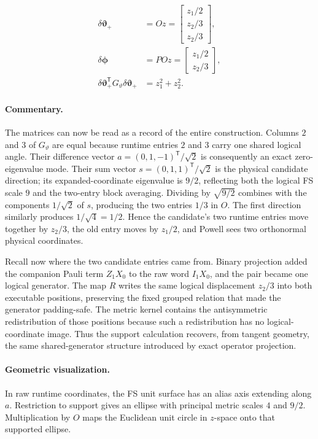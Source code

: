 \documentclass[10pt,twocolumn]{article}
\newcommand{\commentaryblock}{\paragraph{Commentary.}}
\newcommand{\geometryblock}{\paragraph{Geometric visualization.}}
\begin{document}
\begin{align}
\delta\bm\vartheta_+
&=Oz
=\begin{bmatrix}z_1/2\\z_2/3\\z_2/3\end{bmatrix},\nonumber\\
\delta\bm\phi
&=POz
=\begin{bmatrix}z_1/2\\z_2/3\end{bmatrix},\nonumber\\
\delta\bm\vartheta_+^{\mathsf T}G_\vartheta
\delta\bm\vartheta_+
&=z_1^2+z_2^2.
\label{eq:toy-final-map}
\end{align}

\commentaryblock The matrices can now be read as a record of the entire
construction. Columns \(2\) and \(3\) of \(G_\vartheta\) are equal because
runtime entries \(2\) and \(3\) carry one shared logical angle. Their
difference vector \(a=(0,1,-1)^{\mathsf T}/\sqrt2\) is consequently an exact
zero-eigenvalue mode. Their sum vector
\(s=(0,1,1)^{\mathsf T}/\sqrt2\) is the physical candidate direction; its
expanded-coordinate eigenvalue is \(9/2\), reflecting both the logical FS
scale \(9\) and the two-entry block averaging. Dividing by
\(\sqrt{9/2}\) combines with the components \(1/\sqrt2\) of \(s\), producing
the two entries \(1/3\) in \(O\). The first direction similarly produces
\(1/\sqrt4=1/2\). Hence the candidate's two runtime entries move together by
\(z_2/3\), the old entry moves by \(z_1/2\), and Powell sees two orthonormal
physical coordinates.

Recall now where the two candidate entries came from. Binary projection added
the companion Pauli term \(Z_1X_0\) to the raw word \(I_1X_0\), and the pair
became one logical generator. The map \(R\) writes the same logical
displacement \(z_2/3\) into both executable positions, preserving the fixed
grouped relation that made the generator padding-safe. The metric kernel
contains the antisymmetric redistribution of those positions because such a
redistribution has no logical-coordinate image. Thus the support calculation
recovers, from tangent geometry, the same shared-generator structure introduced
by exact operator projection.

\geometryblock In raw runtime coordinates, the FS unit surface has an alias
axis extending along \(a\). Restriction to support gives an ellipse with
principal metric scales \(4\) and \(9/2\). Multiplication by \(O\) maps the
Euclidean unit circle in \(z\)-space onto that supported ellipse.
\end{document}
